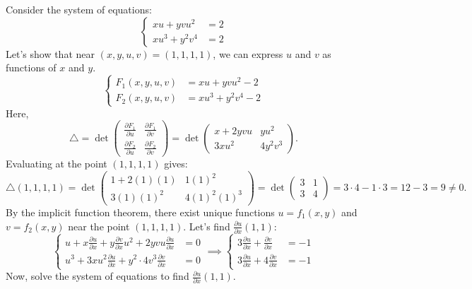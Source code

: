 \begin{example}
Consider the system of equations:
\[
\begin{cases}
    xu+yvu^2&=2\\
    xu^3+y^2v^4&=2
\end{cases}
\]
Let's show that near $(x,y,u,v)=(1,1,1,1)$, we can express $u$ and $v$ as functions of $x$ and $y$.
\[
\begin{cases}
F_1(x,y,u,v) &= xu+yvu^2-2\\
F_2(x,y,u,v) &= xu^3+y^2v^4-2
\end{cases}
\]
Here, \[
\triangle = \det\begin{pmatrix}
\frac{\partial F_1}{\partial u} & \frac{\partial F_1}{\partial v}\\
\frac{\partial F_2}{\partial u} & \frac{\partial F_2}{\partial v}
\end{pmatrix} = \det\begin{pmatrix}x+2yvu & yu^2\\
3xu^2 & 4y^2v^3 \end{pmatrix}.
\]
Evaluating at the point $(1,1,1,1)$ gives:
\[\triangle(1,1,1,1) = \det\begin{pmatrix}1+2(1)(1) & 1(1)^2\\
3(1)(1)^2 & 4(1)^2(1)^3 \end{pmatrix} = \det\begin{pmatrix}3 & 1\\
3 & 4 \end{pmatrix} = 3\cdot4 - 1\cdot3 = 12 - 3 = 9 \neq 0.\]
By the implicit function theorem, there exist unique functions \(u=f_1(x,y)\) and \(v=f_2(x,y)\) near the point $(1,1,1,1)$.
Let's find $\frac{\partial u}{\partial x}(1,1)$:
\[
\begin{cases}
    u+x\frac{\partial u}{\partial x}+y\frac{\partial v}{\partial x}u^2+2yvu\frac{\partial u}{\partial x}&=0\\
    u^3+3xu^2\frac{\partial u}{\partial x}+y^2\cdot 4v^3\frac{\partial v}{\partial x}&=0
\end{cases} \implies 
\begin{cases}
    3\frac{\partial u}{\partial x}+\frac{\partial v}{\partial x}&=-1\\
    3\frac{\partial u}{\partial x}+4\frac{\partial v}{\partial x}&=-1
\end{cases}
\]  
Now, solve the system of equations to find $\frac{\partial u}{\partial x}(1,1)$.
\end{example}